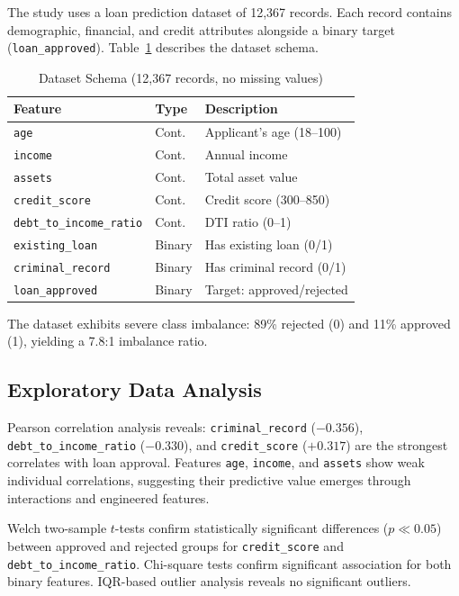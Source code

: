 \documentclass[journal]{IEEEtran}
\begin{document}
The study uses a loan prediction dataset of 12,367 records. Each record contains demographic, financial, and credit attributes alongside a binary target (\texttt{loan\_approved}). Table~\ref{tab:schema} describes the dataset schema.

\begin{table}[!t]
\centering
\caption{Dataset Schema (12,367 records, no missing values)}
\label{tab:schema}
\begin{tabular}{llp{3.8cm}}
\toprule
\textbf{Feature} & \textbf{Type} & \textbf{Description} \\
\midrule
\texttt{age} & Cont. & Applicant's age (18--100) \\
\texttt{income} & Cont. & Annual income \\
\texttt{assets} & Cont. & Total asset value \\
\texttt{credit\_score} & Cont. & Credit score (300--850) \\
\texttt{debt\_to\_income\_ratio} & Cont. & DTI ratio (0--1) \\
\texttt{existing\_loan} & Binary & Has existing loan (0/1) \\
\texttt{criminal\_record} & Binary & Has criminal record (0/1) \\
\texttt{loan\_approved} & Binary & Target: approved/rejected \\
\bottomrule
\end{tabular}
\end{table}

The dataset exhibits severe class imbalance: 89\% rejected (0) and 11\% approved (1), yielding a 7.8:1 imbalance ratio.


\subsection{Exploratory Data Analysis}

Pearson correlation analysis reveals: \texttt{criminal\_record} ($-0.356$), \texttt{debt\_to\_income\_ratio} ($-0.330$), and \texttt{credit\_score} ($+0.317$) are the strongest correlates with loan approval. Features \texttt{age}, \texttt{income}, and \texttt{assets} show weak individual correlations, suggesting their predictive value emerges through interactions and engineered features.

Welch two-sample $t$-tests confirm statistically significant differences ($p \ll 0.05$) between approved and rejected groups for \texttt{credit\_score} and \texttt{debt\_to\_income\_ratio}. Chi-square tests confirm significant association for both binary features. IQR-based outlier analysis reveals no significant outliers.
\end{document}
